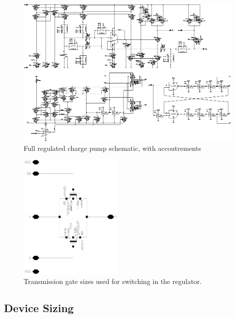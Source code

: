 \documentclass[11pt,letterpaper]{article}
\begin{document}
\begin{figure}[ht]
    \centering
    \includegraphics[width=\textwidth]{images/cp_sch_full.eps} 
        \caption{Full regulated charge pump schematic, with accoutrements}\label{fig:sch_full}
\end{figure}

\begin{figure}[ht]
    \centering
    \includegraphics[width=2in]{images/sch_tg.eps} 
    \caption{Transmission gate sizes used for switching in the regulator.}\label{fig:tg_sch}
\end{figure}

\subsection{Device Sizing}
\end{document}
